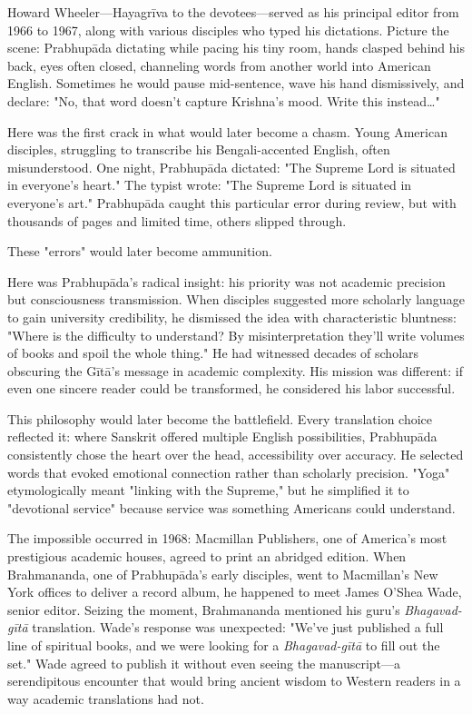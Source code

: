 \documentclass[12pt,twoside]{book}
\begin{document}
\clearpage

Howard Wheeler—Hayagrīva to the devotees—served as his principal editor from 1966 to 1967, along with various disciples who typed his dictations. Picture the scene: Prabhupāda dictating while pacing his tiny room, hands clasped behind his back, eyes often closed, channeling words from another world into American English. Sometimes he would pause mid-sentence, wave his hand dismissively, and declare: "No, that word doesn't capture Krishna's mood. Write this instead\ldots{}"

Here was the first crack in what would later become a chasm. Young American disciples, struggling to transcribe his Bengali-accented English, often misunderstood. One night, Prabhupāda dictated: "The Supreme Lord is situated in everyone's heart." The typist wrote: "The Supreme Lord is situated in everyone's art." Prabhupāda caught this particular error during review, but with thousands of pages and limited time, others slipped through.

These "errors" would later become ammunition.

Here was Prabhupāda's radical insight: his priority was not academic precision but consciousness transmission. When disciples suggested more scholarly language to gain university credibility, he dismissed the idea with characteristic bluntness: "Where is the difficulty to understand? By misinterpretation they'll write volumes of books and spoil the whole thing." He had witnessed decades of scholars obscuring the Gītā's message in academic complexity. His mission was different: if even one sincere reader could be transformed, he considered his labor successful.

This philosophy would later become the battlefield. Every translation choice reflected it: where Sanskrit offered multiple English possibilities, Prabhupāda consistently chose the heart over the head, accessibility over accuracy. He selected words that evoked emotional connection rather than scholarly precision. "Yoga" etymologically meant "linking with the Supreme," but he simplified it to "devotional service" because service was something Americans could understand.

The impossible occurred in 1968: Macmillan Publishers, one of America's most prestigious academic houses, agreed to print an abridged edition. When Brahmananda, one of Prabhupāda's early disciples, went to Macmillan's New York offices to deliver a record album, he happened to meet James O'Shea Wade, senior editor. Seizing the moment, Brahmananda mentioned his guru's \emph{Bhagavad-gītā} translation. Wade's response was unexpected: "We've just published a full line of spiritual books, and we were looking for a \emph{Bhagavad-gītā} to fill out the set." Wade agreed to publish it without even seeing the manuscript—a serendipitous encounter that would bring ancient wisdom to Western readers in a way academic translations had not.
\end{document}
